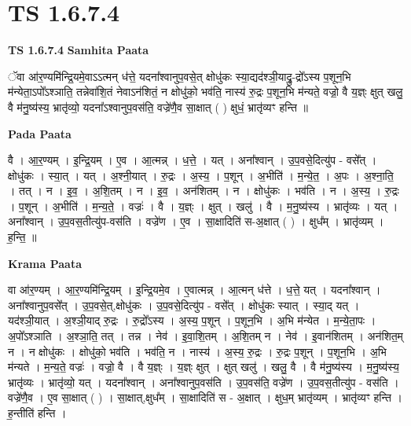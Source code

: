 \documentclass[17pt]{extarticle}
\begin{document}
\section*{ TS 1.6.7.4 }

\textbf{TS 1.6.7.4 } \newline
\textbf{Samhita Paata} \newline

ॅवा आ॑र॒ण्यमि॑न्द्रि॒यमे॒वाऽऽत्मन् ध॑त्ते॒ यदना᳚श्वानुप॒वसे॒त् क्षोधु॑कः स्या॒द्यद॑श्ञी॒याद्रु॒-द्रो᳚ऽस्य प॒शून॒भि म॑न्येता॒ऽपो᳚ऽश्ञाति॒ तन्नेवा॑शि॒तं नेवाऽन॑शितं॒ न क्षोधु॑को॒ भव॑ति॒ नास्य॑ रु॒द्रः प॒शून॒भि म॑न्यते॒ वज्रो॒ वै य॒ज्ञ्ः क्षुत् खलु॒ वै म॑नु॒ष्य॑स्य॒ भ्रातृ॑व्यो॒ यदना᳚ऽश्वानुप॒वस॑ति॒ वज्रे॑णै॒व सा॒क्षात् ( ) क्षुधं॒ भ्रातृ॑व्यꣳ हन्ति ॥ \newline

\textbf{Pada Paata} \newline

वै । आ॒र॒ण्यम् । इ॒न्द्रि॒यम् । ए॒व । आ॒त्मन्न् । ध॒त्ते॒ । यत् । अना᳚श्वान् । उ॒प॒वसे॒दित्यु॑प - वसे᳚त् । क्षोधु॑कः । स्या॒त् । यत् । अ॒श्नी॒यात् । रु॒द्रः । अ॒स्य॒ । प॒शून् । अ॒भीति॑ । म॒न्ये॒त॒ । अ॒पः । अ॒श्ना॒ति॒ । तत् । न । इ॒व॒ । अ॒शि॒तम् । न । इ॒व॒ । अन॑शितम् । न । क्षोधु॑कः । भव॑ति । न । अ॒स्य॒ । रु॒द्रः । प॒शून् । अ॒भीति॑ । म॒न्य॒ते॒ । वज्रः॑ । वै । य॒ज्ञ्ः । क्षुत् । खलु॑ । वै । म॒नु॒ष्य॑स्य । भ्रातृ॑व्यः । यत् । अना᳚श्वान् । उ॒प॒वस॒तीत्यु॑प-वस॑ति । वज्रे॑ण । ए॒व । सा॒क्षादिति॑ स-अ॒क्षात् ( ) । क्षुध᳚म् । भ्रातृ॑व्यम् । ह॒न्ति॒ ॥  \newline


\textbf{Krama Paata} \newline

वा आ॑र॒ण्यम् । आ॒र॒ण्यमि॑न्द्रि॒यम् । इ॒न्द्रि॒यमे॒व । ए॒वात्मन्न् । आ॒त्मन् ध॑त्ते । ध॒त्ते॒ यत् । यदना᳚श्वान् । अना᳚श्वानुप॒वसे᳚त् । उ॒प॒वसे॒त्,क्षोधु॑कः । उ॒प॒वसे॒दित्यु॑प - वसे᳚त् । क्षोधु॑कः स्यात् । स्या॒द् यत् । यद॑श्ञी॒यात् । अ॒श्ञी॒याद् रु॒द्रः । रु॒द्रो᳚ऽस्य । अ॒स्य॒ प॒शून् । प॒शून॒भि । अ॒भि म॑न्येत । म॒न्ये॒ता॒पः । अ॒पो᳚ऽश्ञाति । अ॒श्ञा॒ति॒ तत् । तन्न । नेव॑ । इ॒वा॒शि॒तम् । अ॒शि॒तम् न । नेव॑ । इ॒वान॑शितम् । अन॑शित॒म् न । न क्षोधु॑कः । क्षोधु॑को॒ भव॑ति । भव॑ति॒ न । नास्य॑ । अ॒स्य॒ रु॒द्रः । रु॒द्रः प॒शून् । प॒शून॒भि । अ॒भि म॑न्यते । म॒न्य॒ते॒ वज्रः॑ । वज्रो॒ वै । वै य॒ज्ञ्ः । य॒ज्ञ्ः क्षुत् । क्षुत् खलु॑ । खलु॒ वै । वै म॑नु॒ष्य॑स्य । म॒नु॒ष्य॑स्य॒ भ्रातृ॑व्यः । भ्रातृ॑व्यो॒ यत् । यदना᳚श्वान् । अना᳚श्वानुप॒वस॑ति । उ॒प॒वस॑ति॒ वज्रे॑ण । उ॒प॒वस॒तीत्यु॑प - वस॑ति । वज्रे॑णै॒व । ए॒व सा॒क्षात् ( ) । सा॒क्षात्,क्षुध᳚म् । सा॒क्षादिति॑ स - अ॒क्षात् । क्षुध॒म् भ्रातृ॑व्यम् । भ्रातृ॑व्यꣳ हन्ति । ह॒न्तीति॑ हन्ति । \newline
\end{document}
